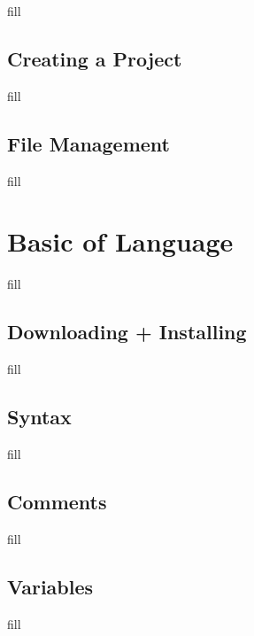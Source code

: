 \documentclass[
  b5paper]{book}
\begin{document}
fill

\hypertarget{creating-a-project}{%
\subsection*{Creating a Project}\label{creating-a-project}}

fill

\hypertarget{file-management}{%
\subsection*{File Management}\label{file-management}}

fill

\hypertarget{basic-of-language}{%
\section{Basic of Language}\label{basic-of-language}}

fill

\hypertarget{downloading-installing-1}{%
\subsection*{Downloading + Installing}\label{downloading-installing-1}}

fill

\hypertarget{syntax}{%
\subsection*{Syntax}\label{syntax}}

fill

\hypertarget{comments}{%
\subsection*{Comments}\label{comments}}

fill

\hypertarget{variables}{%
\subsection*{Variables}\label{variables}}

fill
\end{document}
